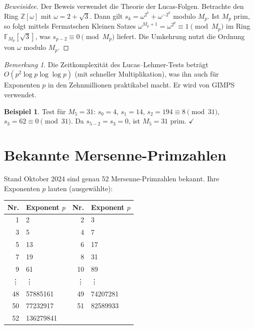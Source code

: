 \documentclass[12pt,a4paper]{amsart}
\theoremstyle{definition}
\newtheorem{example}[theorem]{Beispiel}
\theoremstyle{remark}
\newtheorem{bemerkung}[theorem]{Bemerkung}
\newcommand{\Z}{\mathbb{Z}}
\newcommand{\F}{\mathbb{F}}
\begin{document}
\begin{proof}[Beweisidee]
Der Beweis verwendet die Theorie der Lucas-Folgen.
Betrachte den Ring $\Z[\omega]$ mit $\omega = 2 + \sqrt{3}$.
Dann gilt $s_k = \omega^{2^k} + \omega^{-2^k}$ modulo $M_p$.
Ist $M_p$ prim, so folgt mittels Fermatschen Kleinen Satzes
$\omega^{M_p+1} = \omega^{2^p} \equiv 1 \pmod{M_p}$
im Ring $\F_{M_p}[\sqrt{3}]$, was $s_{p-2} \equiv 0 \pmod{M_p}$ liefert.
Die Umkehrung nutzt die Ordnung von $\omega$ modulo $M_p$.
\end{proof}

\begin{bemerkung}
Die Zeitkomplexität des Lucas--Lehmer-Tests beträgt $O(p^2 \log p \log \log p)$
(mit schneller Multiplikation), was ihn auch für Exponenten $p$ in den
Zehnmillionen praktikabel macht. Er wird von GIMPS verwendet.
\end{bemerkung}

\begin{example}
Test für $M_5 = 31$: $s_0 = 4$, $s_1 = 14$, $s_2 = 194 \equiv 8 \pmod{31}$,
$s_3 = 62 \equiv 0 \pmod{31}$. Da $s_{5-2} = s_3 = 0$, ist $M_5 = 31$ prim. $\checkmark$
\end{example}

\section{Bekannte Mersenne-Primzahlen}

Stand Oktober 2024 sind genau 52 Mersenne-Primzahlen bekannt.
Ihre Exponenten $p$ lauten (ausgewählte):

\begin{center}
\begin{tabular}{rl|rl}
\toprule
Nr. & Exponent $p$ & Nr. & Exponent $p$ \\
\midrule
1 & 2 & 2 & 3 \\
3 & 5 & 4 & 7 \\
5 & 13 & 6 & 17 \\
7 & 19 & 8 & 31 \\
9 & 61 & 10 & 89 \\
\vdots & \vdots & \vdots & \vdots \\
48 & 57885161 & 49 & 74207281 \\
50 & 77232917 & 51 & 82589933 \\
52 & 136279841 & & \\
\bottomrule
\end{tabular}
\end{center}
\end{document}
